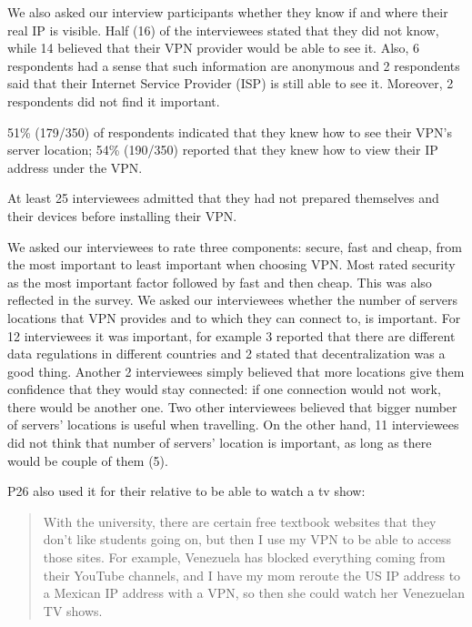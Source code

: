 We also asked our interview participants whether they know if and where their
real IP is visible. Half (16) of the interviewees stated that they did not
know, while 14 believed that their VPN provider would be able to see it. Also,
6 respondents had a sense that such information are anonymous and 2
respondents said that their Internet Service Provider (ISP) is still able to
see it. Moreover, 2 respondents did not find it important.

51\% (179/350) of respondents indicated that they knew how to see their
VPN’s server location; 54\% (190/350) reported that they knew how to view
their IP address under the VPN.

At least 25 interviewees admitted
that they had not prepared themselves and their devices before installing
their VPN.

 We asked our interviewees to rate three
components: secure, fast and cheap, from the most important to least important
when choosing VPN. Most rated security as the most important factor followed by fast and then cheap. This was also reflected in the survey.
We asked our interviewees whether the number of servers
locations that VPN provides and to which they can connect to, is important.
For 12 interviewees it was important, for example 3 reported that there are
different data regulations in different countries and 2 stated that
decentralization was a good thing. Another 2 interviewees simply believed that
more locations give them confidence that they would stay connected: if one
connection would not work, there would be another one. Two other interviewees
believed that bigger number of servers’ locations is useful when travelling.
On the other hand, 11 interviewees did not think that number of servers’
location is important, as long as there would be couple of them (5). 

P26 also used it for their relative to be able to watch a tv show:
\begin{quote}With the university, there
    are certain free textbook websites that they don't like students going on,
    but then I use my VPN to be able to access those sites. For example,
    Venezuela has blocked everything coming from their YouTube channels, and I
    have my mom reroute the US IP address to a Mexican IP address with a VPN,
    so then she could watch her Venezuelan TV shows.\end{quote}